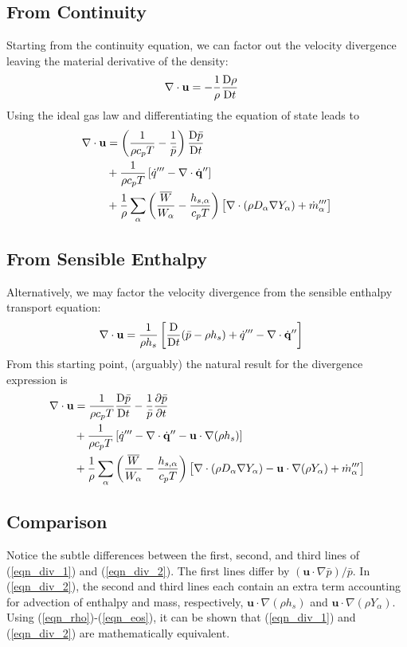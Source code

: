 \subsection{From Continuity}
Starting from the continuity equation, we can factor out the velocity divergence leaving the material derivative of the density:
\begin{align}
\nabla\cdot\mathbf{u} &= -\frac{1}{\rho}\frac{\mbox{D}\rho}{\mbox{D} t}
\end{align}
Using the ideal gas law and differentiating the equation of state leads to
\begin{align}
\label{eqn_div_1}
\nabla\cdot\mathbf{u} &= \left(\frac{1}{\rho c_p T} - \frac{1}{\bar{p}} \right)\frac{\mbox{D} \bar{p}}{\mbox{D} t} \notag\\
&+ \frac{1}{\rho c_p T} \left[ \dot{q}^{\prime\prime\prime} - \nabla\cdot \dot{\mathbf{q}}^{\prime\prime} \right] \notag\\
&+ \frac{1}{\rho} \sum_\alpha \left(\frac{\overline{W}}{W_\alpha} - \frac{h_{s,\alpha}}{c_p T} \right) \big[ \nabla\cdot (\rho D_\alpha \nabla Y_\alpha) + \dot{m}_\alpha^{\prime\prime\prime} \big]
\end{align}

\subsection{From Sensible Enthalpy}
Alternatively, we may factor the velocity divergence from the sensible enthalpy transport equation:
\begin{align}
\label{eqn_div_new}
\nabla\cdot\mathbf{u} &= \frac{1}{\rho h_s} \left[ \frac{\mbox{D}}{\mbox{D} t}(\bar{p}-\rho h_s) + \dot{q}^{\prime\prime\prime} - \nabla\cdot \dot{\mathbf{q}}^{\prime\prime} \right]
\end{align}
From this starting point, (arguably) the natural result for the divergence expression is
\begin{align}
\label{eqn_div_2}
\nabla\cdot\mathbf{u} &= \frac{1}{\rho c_p T}\frac{\mbox{D} \bar{p}}{\mbox{D} t} - \frac{1}{\bar{p}} \frac{\partial \bar{p}}{\partial t} \notag\\
&+ \frac{1}{\rho c_p T}\left[ \dot{q}^{\prime\prime\prime} - \nabla\cdot \dot{\mathbf{q}}^{\prime\prime} - \mathbf{u} \cdot\nabla (\rho h_s) \right] \notag\\
&+ \frac{1}{\rho} \sum_\alpha \left(\frac{\overline{W}}{W_\alpha} - \frac{h_{s,\alpha}}{c_p T} \right) \big[ \nabla\cdot (\rho D_\alpha \nabla Y_\alpha) - \mathbf{u} \cdot \nabla (\rho Y_\alpha) + \dot{m}_\alpha^{\prime\prime\prime} \big]
\end{align}

\subsection{Comparison}
Notice the subtle differences between the first, second, and third lines of (\ref{eqn_div_1}) and (\ref{eqn_div_2}).  The first lines differ by $\displaystyle (\mathbf{u}\cdot\nabla \bar{p})/\bar{p}$. In (\ref{eqn_div_2}), the second and third lines each contain an extra term accounting for advection of enthalpy and mass, respectively, $\mathbf{u} \cdot\nabla (\rho h_s)$ and $\mathbf{u} \cdot \nabla (\rho Y_\alpha)$.  Using (\ref{eqn_rho})-(\ref{eqn_eos}), it can be shown that (\ref{eqn_div_1}) and (\ref{eqn_div_2}) are mathematically equivalent.


